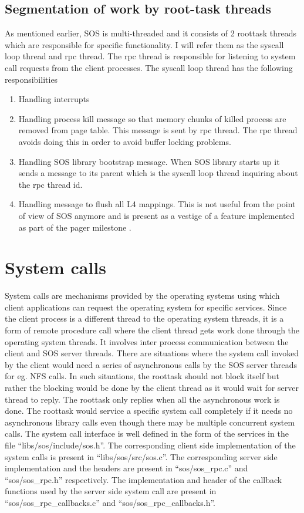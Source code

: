 \documentclass[a4paper, 11pt]{article}
\begin{document}
\subsection{Segmentation of work by root-task threads}
As mentioned earlier, SOS is multi-threaded and it consists of 2 roottask
threads which are responsible for specific functionality. I will refer
them as the syscall loop thread and rpc thread. The rpc thread is
responsible for listening to system call requests from the client
processes. The syscall loop thread has the following responsibilities
\begin{enumerate}
\item Handling interrupts
\item Handling process kill message so that memory chunks of killed
  process are removed from page table. This message is sent by rpc
  thread. The rpc thread avoids doing this in order to avoid buffer locking
  problems.
\item Handling SOS library bootstrap message. When SOS library starts
  up it sends a message to its parent which is the syscall loop thread
  inquiring about the rpc thread id.
\item Handling message to flush all L4 mappings. This is not useful
  from the point of view of SOS anymore and is present as a vestige of a
  feature implemented as part of the pager milestone \cite{os-project2}.
\end{enumerate}
\newpage
\section{System calls}
System calls are mechanisms provided by the operating systems using
which client applications can request the operating system for
specific services. Since the client process is a different thread to
the operating system threads, it is a form of remote procedure call where the client
thread gets work done through the operating system threads. It
involves inter process communication between the client and SOS server
threads. There are situations where the system call invoked by the
client would need a series of asynchronous calls by the SOS server
threads for eg. NFS calls. In such situations, the roottask should not
block itself but rather the blocking would be done by the client
thread as it would wait for server thread to reply. The roottask only
replies when all the asynchronous work is done. The roottask would
service a specific system call completely if it needs no asynchronous
library calls even though there may be multiple concurrent system
calls. The system call interface is well defined in the form of the
services in the file ``libs/sos/include/sos.h''. The corresponding
client side implementation of the system calls is present in
``libs/sos/src/sos.c''. The corresponding server side implementation
and the headers are present in ``sos/sos\_rpc.c'' and ``sos/sos\_rpc.h''
respectively. The implementation and header of the callback functions used by the
server side system call are present in ``sos/sos\_rpc\_callbacks.c'' and
``sos/sos\_rpc\_callbacks.h''. 
\end{document}
